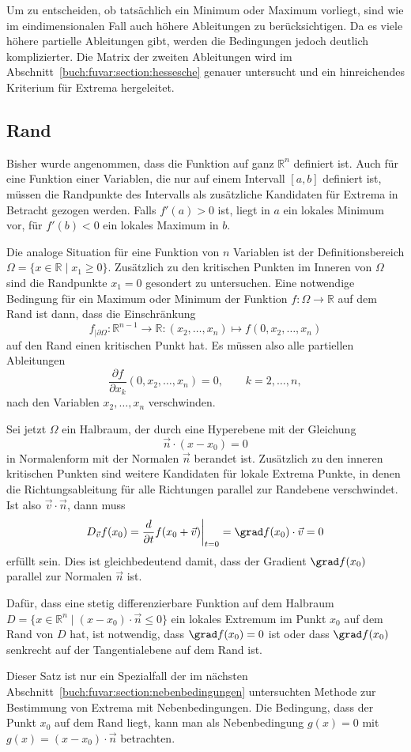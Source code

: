 Um zu entscheiden, ob tatsächlich ein Minimum oder Maximum vorliegt,
sind wie im eindimensionalen Fall auch höhere Ableitungen zu berücksichtigen.
Da es viele höhere partielle Ableitungen gibt, werden die Bedingungen
jedoch deutlich komplizierter.
Die Matrix der zweiten Ableitungen wird im
Abschnitt~\ref{buch:fuvar:section:hessesche} genauer untersucht 
und ein hinreichendes Kriterium für Extrema hergeleitet.

%
%
\subsection{Rand}
Bisher wurde angenommen, dass die Funktion auf ganz $\mathbb{R}^n$
definiert ist.
Auch für eine Funktion einer Variablen, die nur auf einem Intervall
$[a,b]$ definiert ist, müssen die Randpunkte des Intervalls als
zusätzliche Kandidaten für Extrema in Betracht gezogen werden.
Falls $f'(a)>0$ ist, liegt in $a$ ein lokales Minimum vor, für
$f'(b)<0$ ein lokales Maximum in $b$.

Die analoge Situation für eine Funktion von $n$ Variablen ist der
Definitionsbereich $\Omega=\{x\in \mathbb{R}\mid x_1\ge 0\}$.
Zusätzlich zu den kritischen Punkten im Inneren von $\Omega$ sind die
Randpunkte $x_1=0$ gesondert zu untersuchen.
Eine notwendige Bedingung für ein Maximum oder Minimum der Funktion
$f\colon \Omega\to\mathbb{R}$ auf dem Rand ist dann, dass die Einschränkung
\[
f_{|\partial \Omega}
\colon
\mathbb{R}^{n-1}\to \mathbb{R}
:
(x_2,\dots,x_n)\mapsto f(0,x_2,\dots,x_n)
\]
auf den Rand einen kritischen Punkt hat.
Es müssen also alle partiellen Ableitungen
\[
\frac{\partial f}{\partial x_k}(0,x_2,\dots,x_n)
=
0,\qquad k=2,\dots,n,
\]
nach den Variablen
$x_2,\dots,x_n$ verschwinden.

Sei jetzt $\Omega$ ein Halbraum, der durch eine Hyperebene mit der Gleichung
\[
\vec{n}\cdot (x-x_0) = 0
\]
in Normalenform mit der Normalen $\vec{n}$ berandet ist.
Zusätzlich zu den inneren kritischen Punkten sind weitere Kandidaten
für lokale Extrema Punkte, in denen die Richtungsableitung für alle
Richtungen parallel zur Randebene verschwindet.
Ist also $\vec{v}\cdot \vec{n}$, dann muss
\[
D_{\vec{v}} f(x_0)
=
\frac{d}{\partial t}f(x_0+\vec{v})\bigg|_{t=0}
=
\grad f(x_0)\cdot \vec{v}
=
0
\]
erfüllt sein.
Dies ist gleichbedeutend damit, dass der Gradient $\grad f(x_0)$ parallel
zur Normalen $\vec{n}$ ist.

\begin{satz}
Dafür, dass eine stetig differenzierbare Funktion auf dem Halbraum
$D=\{x\in\mathbb{R}^n\mid (x-x_0)\cdot\vec{n}\le 0\}$ ein lokales 
Extremum im Punkt $x_0$ auf dem Rand von $D$ hat, ist notwendig,
dass $\grad f(x_0)=0$ ist oder dass $\grad f(x_0)$ senkrecht auf der Tangentialebene auf dem Rand ist.
\end{satz}

Dieser Satz ist nur ein Spezialfall der im nächsten
Abschnitt~\ref{buch:fuvar:section:nebenbedingungen}
untersuchten Methode zur Bestimmung von Extrema mit Nebenbedingungen.
Die Bedingung, dass der Punkt $x_0$ auf dem Rand liegt, kann man
als Nebenbedingung $g(x) = 0$ mit $g(x)=(x-x_0)\cdot\vec{n}$ betrachten.

